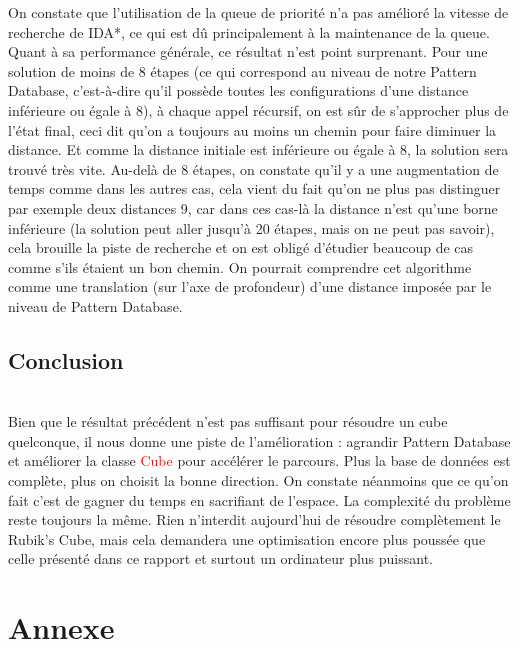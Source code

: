 \documentclass[fleqn,10pt,french]{SelfArx} %
\newcommand{\class}[1]{\colorbox{bg}{\textcolor{red}{\usefont{OT1}{cmtt}{m}{n}#1}}}
\begin{document}
\indent
On constate que l’utilisation de la queue de priorité n’a pas amélioré la vitesse de recherche de IDA*, ce qui est dû principalement à la maintenance de la queue. Quant à sa performance générale, ce résultat n’est point surprenant. Pour une solution de moins de 8 étapes (ce qui correspond au niveau de notre Pattern Database, c’est-à-dire qu’il possède toutes les configurations d’une distance inférieure ou égale à 8), à chaque appel récursif, on est sûr de s’approcher plus de l’état final, ceci dit qu’on a toujours au moins un chemin pour faire diminuer la distance. Et comme la distance initiale est inférieure ou égale à 8, la solution sera trouvé très vite. Au-delà de 8 étapes, on constate qu’il y a une augmentation de temps comme dans les autres cas, cela vient du fait qu’on ne plus pas distinguer par exemple deux distances 9, car dans ces cas-là la distance n’est qu’une borne inférieure (la solution peut aller jusqu’à 20 étapes, mais on ne peut pas savoir), cela brouille la piste de recherche et on est obligé d’étudier beaucoup de cas comme s’ils étaient un bon chemin. On pourrait comprendre cet algorithme comme une translation (sur l’axe de profondeur) d’une distance imposée par le niveau de Pattern Database.

\subsection{Conclusion}

~\\\indent
Bien que le résultat précédent n’est pas suffisant pour résoudre un cube quelconque, il nous donne une piste de l’amélioration : agrandir Pattern Database et améliorer la classe \class{Cube} pour accélérer le parcours. Plus la base de données est complète, plus on choisit la bonne direction. On constate néanmoins que ce qu’on fait c’est de gagner du temps en sacrifiant de l’espace. La complexité du problème reste toujours la même. Rien n’interdit aujourd’hui de résoudre complètement le Rubik’s Cube, mais cela demandera une optimisation encore plus poussée que celle présenté dans ce rapport et surtout un ordinateur plus puissant.

\section*{Annexe} %
\end{document}
